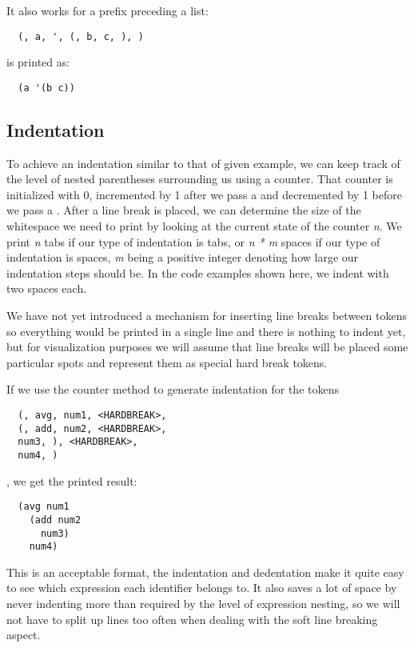 It also works for a prefix preceding a list:
\begin{verbatim}
  (, a, ', (, b, c, ), )
\end{verbatim}
is printed as:
\begin{verbatim}
  (a '(b c))
\end{verbatim}

\subsection{Indentation}
To achieve an indentation similar to that of given example,
we can keep track of the level of nested parentheses surrounding us using a counter.
That counter is initialized with 0,
incremented by 1 after we pass a  and
decremented by 1 before we pass a .
After a line break is placed, we can determine the size of the whitespace we need to print
by looking at the current state of the counter \textit{n}.
We print \textit{n} tabs if our type of indentation is tabs,
or \textit{n * m} spaces if our type of indentation is spaces,
\textit{m} being a positive integer denoting how large our indentation steps should be.
In the code examples shown here, we indent with two spaces each.

We have not yet introduced a mechanism for inserting line breaks between tokens
so everything would be printed in a single line and there is nothing to indent yet,
but for visualization purposes we will assume that line breaks will be placed
some particular spots and represent them as special hard break tokens.

If we use the counter method to generate indentation for the tokens
\begin{verbatim}
  (, avg, num1, <HARDBREAK>,
  (, add, num2, <HARDBREAK>,
  num3, ), <HARDBREAK>,
  num4, )
\end{verbatim}
, we get the printed result:
\begin{verbatim}
  (avg num1
    (add num2
      num3)
    num4)
\end{verbatim}
This is an acceptable format, the indentation and dedentation make it
quite easy to see which expression each identifier belongs to.
It also saves a lot of space by never indenting more than required by the level of expression nesting,
so we will not have to split up lines too often when dealing with the soft line breaking aspect.

